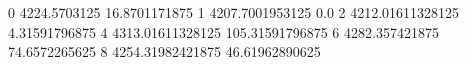 0 4224.5703125 16.8701171875
1 4207.7001953125 0.0
2 4212.01611328125 4.31591796875
4 4313.01611328125 105.31591796875
6 4282.357421875 74.6572265625
8 4254.31982421875 46.61962890625
